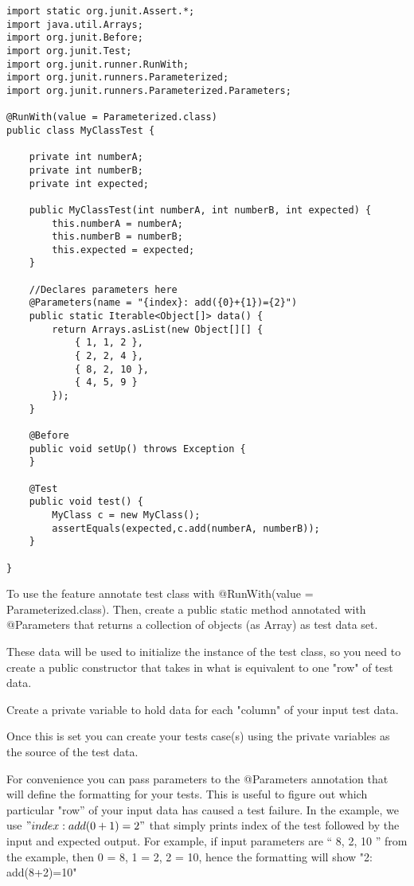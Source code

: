\documentclass{article}
\begin{document}
\begin{lstlisting}
import static org.junit.Assert.*;
import java.util.Arrays;
import org.junit.Before;
import org.junit.Test;
import org.junit.runner.RunWith;
import org.junit.runners.Parameterized;
import org.junit.runners.Parameterized.Parameters;

@RunWith(value = Parameterized.class)
public class MyClassTest {

	private int numberA;
	private int numberB;
	private int expected;
	
	public MyClassTest(int numberA, int numberB, int expected) {
		this.numberA = numberA;
		this.numberB = numberB;
		this.expected = expected;
	}

	//Declares parameters here
	@Parameters(name = "{index}: add({0}+{1})={2}")
	public static Iterable<Object[]> data() {
		return Arrays.asList(new Object[][] { 
			{ 1, 1, 2 }, 
			{ 2, 2, 4 }, 
			{ 8, 2, 10 }, 
			{ 4, 5, 9 } 
		});
	}
	
	@Before
	public void setUp() throws Exception {
	}

	@Test
	public void test() {
		MyClass c = new MyClass();
		assertEquals(expected,c.add(numberA, numberB));
	}

}
\end{lstlisting}

To use the feature annotate test class with
@RunWith(value = Parameterized.class). Then, create a public static
method annotated with @Parameters that returns a collection of objects
(as Array) as test data set.

These data will be used to initialize the instance of the test class,
so you need to create a public constructor that takes in what is
equivalent to one "row" of test data.

Create a private variable to hold data for each "column" of your
input test data. 

Once this is set you can create your tests case(s) using the private
variables as the source of the test data.

For convenience you can pass parameters to the @Parameters annotation
that will define the formatting for your tests. This is useful to
figure out which particular "row'' of your input data has caused a
test failure. In the example, we use $"{index}: add({0}+{1})={2}"$
that simply prints index of the test followed by the input and
expected output. For example, if input parameters are  
“{ 8, 2, 10 }” from the example, then {0} = 8, {1} = 2, {2} = 10,
hence the formatting will show "2: add(8+2)=10"
\end{document}
